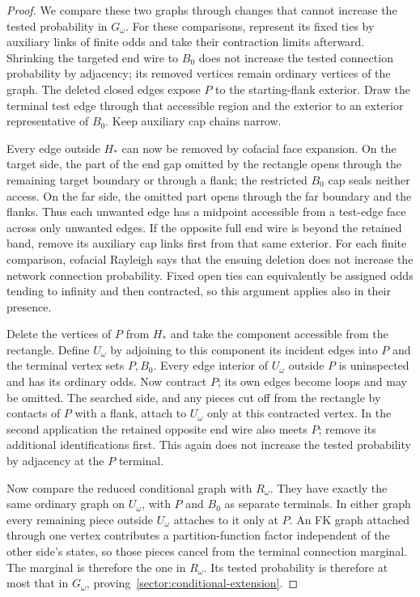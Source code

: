 \begin{proof}
We compare these two graphs through changes that cannot increase
the tested probability in $G_\omega$.  For these comparisons, represent
its fixed ties by auxiliary links of finite odds and take their
contraction limits afterward.
Shrinking the targeted end wire to $B_0$ does not increase the tested connection
probability by adjacency; its removed vertices remain ordinary
vertices of the graph.  The deleted closed edges expose $P$ to the
starting-flank exterior.  Draw the terminal test edge through that
accessible region and the exterior to an exterior representative of
$B_0$.  Keep auxiliary cap chains narrow.

Every edge outside $H_*$ can now be removed by cofacial face expansion.
On the target side, the part of the end gap omitted by the rectangle
opens through the remaining target boundary or through a flank; the
restricted $B_0$ cap seals neither access.  On the far side, the
omitted part opens through the far boundary and the flanks.  Thus
each unwanted edge has a midpoint accessible from a test-edge face
across only unwanted edges.  If the opposite full end wire is beyond
the retained band, remove its auxiliary cap links first from that
same exterior.  For each finite comparison, cofacial Rayleigh says
that the ensuing deletion does not increase the network connection
probability.  Fixed open ties can equivalently be assigned odds
tending to infinity and then contracted, so this argument applies
also in their presence.

Delete the vertices of $P$ from $H_*$ and take the component accessible
from the rectangle.  Define $U_\omega$ by adjoining to this component
its incident edges into $P$ and the terminal vertex sets $P,B_0$.
Every edge interior of $U_\omega$ outside $P$ is uninspected and has its
ordinary odds.  Now contract $P$; its own edges become loops and may
be omitted.
The searched side, and any pieces cut off from the rectangle by
contacts of $P$ with a flank, attach to $U_\omega$ only at this
contracted vertex.  In the second application the retained opposite
end wire also meets $P$; remove its additional
identifications first.  This again does not increase the tested probability by
adjacency at the $P$ terminal.

Now compare the reduced conditional graph with $R_\omega$.  They
have exactly the same ordinary graph on $U_\omega$, with $P$ and
$B_0$ as separate terminals.  In either graph every remaining piece
outside $U_\omega$ attaches to it only at $P$.  An FK graph attached
through one vertex contributes a partition-function factor independent
of the other side's states, so those pieces cancel from the terminal
connection marginal.  The marginal is therefore the one in
$R_\omega$.  Its tested probability is therefore at most that in
$G_\omega$, proving~\eqref{sector:conditional-extension}.


\end{proof}
